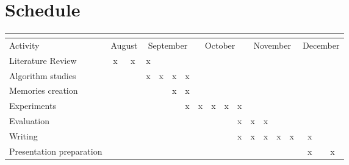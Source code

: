 \chapter{Schedule}

\begin{center}
    \begin{table}[htp]
        \begin{tabular}{l|c|c|c|c|c|c|c|c|c|c|c|c|c|c|c|c|}
        \cline{2-17}
        & \multicolumn{16}{c|}{\cellcolor[HTML]{C0C0C0}{\color[HTML]{333333} Period}} \\ \hline
        \multicolumn{1}{|l|}{\cellcolor[HTML]{C0C0C0}Activity} & \multicolumn{2}{c|}{August} & \multicolumn{4}{c|}{September} & \multicolumn{4}{c|}{October} & \multicolumn{4}{c|}{November} & \multicolumn{2}{c|}{December} \\ \hline
        \multicolumn{1}{|l|}{Literature Review}                & x            & x            & x      &       &       &       &       &       &       &      &       &       &       &       &               &               \\ \hline
        \multicolumn{1}{|l|}{Algorithm studies}                &              &              & x       & x      & x      & x     &      &      &       &      &       &       &       &       &               &               \\ \hline
        \multicolumn{1}{|l|}{Memories creation}                 &              &              &       &      & x     & x     &       &       &       &      &       &       &       &       &               &               \\
        \hline
        \multicolumn{1}{|l|}{Experiments}                      &              &              &        &       &       & x      & x     & x     & x     & x    &       &       &       &       &               &               \\ \hline
        \multicolumn{1}{|l|}{Evaluation}                       &              &              &        &       &       &       &       &       &      & x    & x     & x      &       &       &               &               \\ \hline
        \multicolumn{1}{|l|}{Writing}                          &              &              &        &       &       &       &       &       &       & x    & x     & x     & x     & x     & x             &               \\ \hline
        \multicolumn{1}{|l|}{Presentation preparation}         &              &              &        &       &       &       &       &       &       &      &       &       &       &       & x             & x             \\ \hline
        \end{tabular}
    \end{table}
\end{center}

